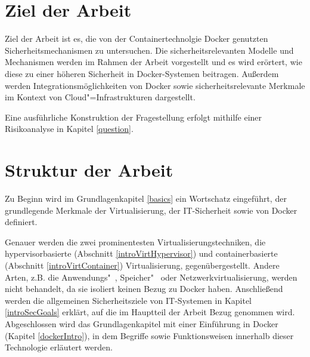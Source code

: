 \documentclass[../main.tex]{subfiles}
\begin{document}


  \section{Ziel der Arbeit}
    Ziel der Arbeit ist es, die von der Containertechnolgie Docker genutzten Sicherheitsmechanismen zu untersuchen. Die sicherheitsrelevanten Modelle und Mechanismen werden im Rahmen der Arbeit vorgestellt und es wird erörtert, wie diese zu einer höheren Sicherheit in Docker-Systemen beitragen.
    Außerdem werden Integrationsmöglichkeiten von Docker sowie sicherheitsrelevante Merkmale im Kontext von Cloud"=Infrastrukturen dargestellt.

    Eine ausführliche Konstruktion der Fragestellung erfolgt mithilfe einer Risikoanalyse in Kapitel \ref{question}.

  \section{Struktur der Arbeit}
    Zu Beginn wird im Grundlagenkapitel \ref{basics} ein Wortschatz eingeführt, der grundlegende Merkmale der Virtualisierung, der IT-Sicherheit sowie von Docker definiert.

    Genauer werden die zwei prominentesten Virtualisierungstechniken, die hypervisorbasierte (Abschnitt \ref{introVirtHypervisor}) und containerbasierte (Abschnitt \ref{introVirtContainer}) Virtualisierung, gegenübergestellt. Andere Arten, z.B. die Anwendungs"~, Spei\-cher"~ oder Netzwerkvirtualisierung, werden nicht behandelt, da sie isoliert keinen Bezug zu Docker haben.  %
    Anschließend werden die allgemeinen Sicherheitsziele von \acrshort{IT}-Systemen in Kapitel \ref{introSecGoals} erklärt, auf die im Hauptteil der Arbeit Bezug genommen wird. Abgeschlossen wird das Grundlagenkapitel mit einer Einführung in Docker (Kapitel \ref{dockerIntro}), in dem Begriffe sowie Funktionsweisen innerhalb dieser Technologie erläutert werden.
\end{document}
